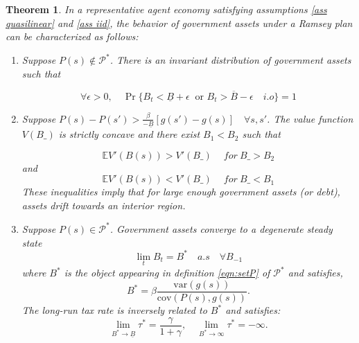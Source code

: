\documentclass[thmsb,11pt]{article}
\newtheorem{theorem}{Theorem}
\newcommand{\var}{\mathrm{var}}
\newcommand{\cov}{\mathrm{cov}}
\begin{document}




\begin{theorem}
\label{thm: rep agent general theorem}
In a representative agent economy satisfying assumptions \ref{ass quasilinear} and \ref{ass iid}, the behavior of  government assets under a Ramsey plan
can be characterized as follows:
\begin{enumerate}
 \item Suppose $P(s) \not \in \mathcal{P}^*$.  There is an invariant distribution of government assets such that

\[\forall \epsilon>0, \quad \Pr\{B_t<\underline{B}+\epsilon  \ \text{ or } B_t>\overline{B}-\epsilon \quad i.o \}=1\]

\item Suppose  $P(s)-P(s')>\frac{\beta}{-\underline{B}}[g(s')-g(s)]\quad \forall s,s'$.
The value function $V(B\_)$ is strictly concave and there exist $B_1<B_2$ such that

\[\mathbb{E}V'(B(s))>V'(B\_) \quad \ for \ B\_>B_2 \]
and
\[\mathbb{E}V'(B(s))<V'(B\_) \quad \ for \  B\_<B_1 \]
These inequalities imply that for large enough government assets (or debt),
assets drift towards an interior region. %
\item Suppose $P(s)\in \mathcal{P}^*$.  Government assets converge to a degenerate steady state
\[\lim_tB_t=  B^*\quad a.s \quad \forall B_{-1} \]
where $B^*$ is the object appearing in definition \eqref{eqn:setP} of $\mathcal{P}^*$ and satisfies,
\begin{equation} \label{ss-debt} B^*=\beta \frac{\var(g(s))}{\cov(P(s),g(s))}. \end{equation}
The long-run tax rate is inversely related to $B^*$ and satisfies:
\[\lim_{B^*\to\underline{B}}\tau^*=\frac{\gamma}{1+\gamma}, \quad \lim_{B^*\to\infty}\tau^*=-\infty .\]

\end{enumerate}


\end{theorem}
\end{document}
